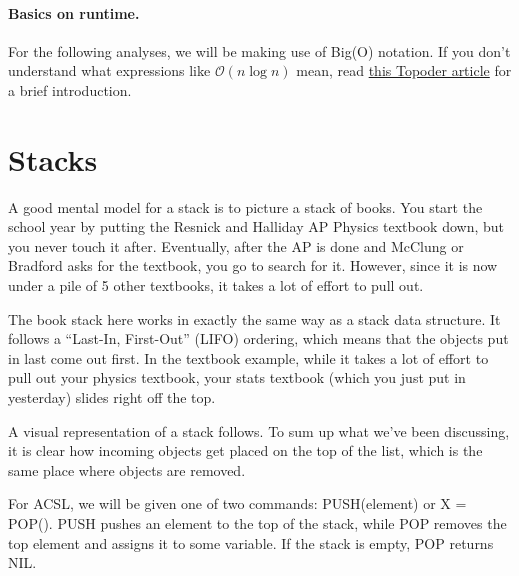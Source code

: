 \documentclass[10pt]{article}
\begin{document}
\paragraph{Basics on runtime.}
For the following analyses, we will be making use of Big(O) notation.
If you don't understand what expressions like $\mathcal{O}(n\log{}n)$ mean,
read \href{https://www.topcoder.com/blog/learning-understanding-big-o-notation/}{this Topoder article}
for a brief introduction.

\section{Stacks}
A good mental model for a stack is to picture a stack of books.
You start the school year by putting the Resnick and Halliday AP Physics
textbook down, but you never touch it after.
Eventually, after the AP is done and McClung or Bradford asks for the textbook,
you go to search for it.
However, since it is now under a pile of 5 other textbooks, it takes a lot of effort to pull out.

The book stack here works in exactly the same way as a stack data structure.
It follows a ``Last-In, First-Out'' (LIFO) ordering, which means that the objects
put in last come out first.
In the textbook example, while it takes a lot of effort to pull out your physics textbook,
your stats textbook (which you just put in yesterday) slides right off the top.

A visual representation of a stack follows.
To sum up what we've been discussing, it is clear how incoming objects
get placed on the top of the list, which is the same place where
objects are removed.
\begin{center}
\end{center}

For ACSL, we will be given one of two commands: PUSH(element) or X = POP().
PUSH pushes an element to the top of the stack, while POP removes the top element
and assigns it to some variable.
If the stack is empty, POP returns NIL\@.
\end{document}
